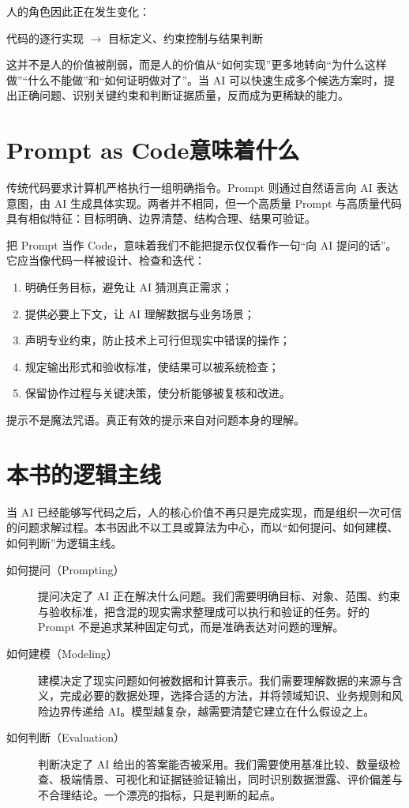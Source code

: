 人的角色因此正在发生变化：

\begin{center}
代码的逐行实现
$\longrightarrow$
目标定义、约束控制与结果判断
\end{center}

这并不是人的价值被削弱，而是人的价值从“如何实现”更多地转向“为什么这样做”“什么不能做”和“如何证明做对了”。当 AI 可以快速生成多个候选方案时，提出正确问题、识别关键约束和判断证据质量，反而成为更稀缺的能力。

\section*{Prompt as Code意味着什么}

传统代码要求计算机严格执行一组明确指令。Prompt 则通过自然语言向 AI 表达意图，由 AI 生成具体实现。两者并不相同，但一个高质量 Prompt 与高质量代码具有相似特征：目标明确、边界清楚、结构合理、结果可验证。

把 Prompt 当作 Code，意味着我们不能把提示仅仅看作一句“向 AI 提问的话”。它应当像代码一样被设计、检查和迭代：

\begin{enumerate}
  \item 明确任务目标，避免让 AI 猜测真正需求；
  \item 提供必要上下文，让 AI 理解数据与业务场景；
  \item 声明专业约束，防止技术上可行但现实中错误的操作；
  \item 规定输出形式和验收标准，使结果可以被系统检查；
  \item 保留协作过程与关键决策，使分析能够被复核和改进。
\end{enumerate}

提示不是魔法咒语。真正有效的提示来自对问题本身的理解。

\section*{本书的逻辑主线}

当 AI 已经能够写代码之后，人的核心价值不再只是完成实现，而是组织一次可信的问题求解过程。本书因此不以工具或算法为中心，而以“如何提问、如何建模、如何判断”为逻辑主线。

\begin{description}
  \item[如何提问（Prompting）] 提问决定了 AI 正在解决什么问题。我们需要明确目标、对象、范围、约束与验收标准，把含混的现实需求整理成可以执行和验证的任务。好的 Prompt 不是追求某种固定句式，而是准确表达对问题的理解。
  \item[如何建模（Modeling）] 建模决定了现实问题如何被数据和计算表示。我们需要理解数据的来源与含义，完成必要的数据处理，选择合适的方法，并将领域知识、业务规则和风险边界传递给 AI。模型越复杂，越需要清楚它建立在什么假设之上。
  \item[如何判断（Evaluation）] 判断决定了 AI 给出的答案能否被采用。我们需要使用基准比较、数量级检查、极端情景、可视化和证据链验证输出，同时识别数据泄露、评价偏差与不合理结论。一个漂亮的指标，只是判断的起点。
\end{description}

